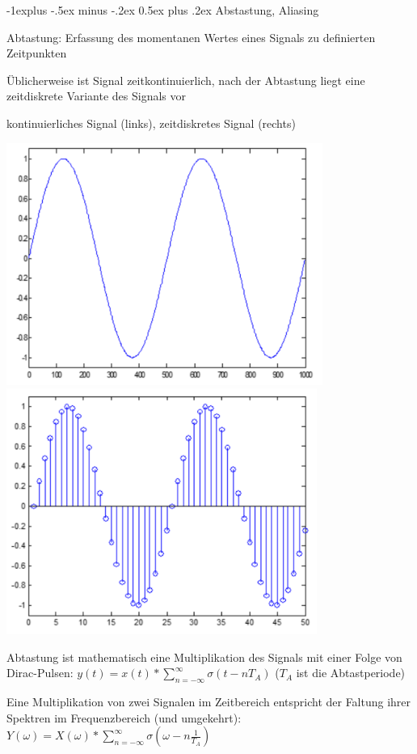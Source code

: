 \documentclass[a4paper]{article}
\makeatletter
\renewcommand{\subsection}{\@startsection{subsection}{2}{0mm}%
 {-1explus -.5ex minus -.2ex}%
 {0.5ex plus .2ex}%
 {\normalfont\normalsize\bfseries}}
\makeatother
\begin{document}
\begin{multicols}{3}
  \subsection{Abstastung, Aliasing}\label{abstastung-aliasing}
  \begin{itemize*}
    \item Abtastung: Erfassung des momentanen Wertes eines Signals zu definierten Zeitpunkten
    \item Üblicherweise ist Signal zeitkontinuierlich, nach der Abtastung liegt eine zeitdiskrete Variante des Signals vor
    \item kontinuierliches Signal (links), zeitdiskretes Signal (rechts) 
  \end{itemize*}
  \begin{center} 
    \includegraphics[width=.3\linewidth]{Assets/Biosignalverarbeitung-kontinuierliches-signal.png}
    \includegraphics[width=.3\linewidth]{Assets/Biosignalverarbeitung-zeitdiskretes-signal.png}
  \end{center}

  Abtastung ist mathematisch eine Multiplikation des Signals mit einer Folge von Dirac-Pulsen:  $y(t)=x(t)*\sum_{n=-\infty}^{\infty}\sigma(t-nT_A)$ ($T_A$ ist die Abtastperiode)

  Eine Multiplikation von zwei Signalen im Zeitbereich entspricht der Faltung ihrer Spektren im Frequenzbereich (und umgekehrt): $Y(\omega)=X(\omega)*\sum_{n=-\infty}^{\infty} \sigma(\omega-n\frac{1}{T_A})$


\end{multicols}
\end{document}
